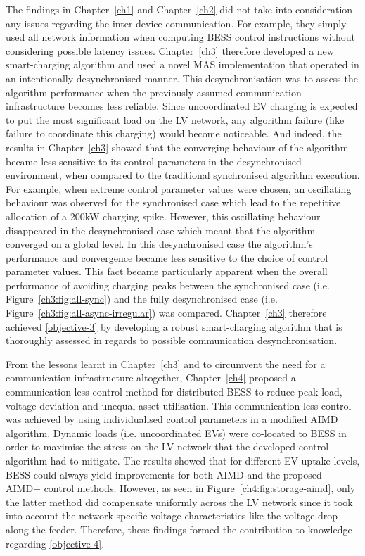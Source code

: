 The findings in Chapter~\ref{ch1} and Chapter~\ref{ch2} did not take into consideration any issues regarding the inter-device communication.
For example, they simply used all network information when computing BESS control instructions without considering possible latency issues.
Chapter~\ref{ch3} therefore developed a new smart-charging algorithm and used a novel MAS implementation that operated in an intentionally desynchronised manner.
This desynchronisation was to assess the algorithm performance when the previously assumed communication infrastructure becomes less reliable.
Since uncoordinated EV charging is expected to put the most significant load on the LV network, any algorithm failure (like failure to coordinate this charging) would become noticeable.
And indeed, the results in Chapter~\ref{ch3} showed that the converging behaviour of the algorithm became less sensitive to its control parameters in the desynchronised environment, when compared to the traditional synchronised algorithm execution.
For example, when extreme control parameter values were chosen, an oscillating behaviour was observed for the synchronised case which lead to the repetitive allocation of a 200kW charging spike.
However, this oscillating behaviour disappeared in the desynchronised case which meant that the algorithm converged on a global level.
In this desynchronised case the algorithm's performance and convergence became less sensitive to the choice of control parameter values.
This fact became particularly apparent when the overall performance of avoiding charging peaks between the synchronised case (i.e. Figure~\ref{ch3:fig:all-sync}) and the fully desynchronised case (i.e. Figure~\ref{ch3:fig:all-async-irregular}) was compared.
Chapter~\ref{ch3} therefore achieved \ref{objective-3} by developing a robust smart-charging algorithm that is thoroughly assessed in regards to possible communication desynchronisation.

From the lessons learnt in Chapter~\ref{ch3} and to circumvent the need for a communication infrastructure altogether, Chapter~\ref{ch4} proposed a communication-less control method for distributed BESS to reduce peak load, voltage deviation and unequal asset utilisation.
This communication-less control was achieved by using individualised control parameters in a modified AIMD algorithm.
Dynamic loads (i.e. uncoordinated EVs) were co-located to BESS in order to maximise the stress on the LV network that the developed control algorithm had to mitigate.
The results showed that for different EV uptake levels, BESS could always yield improvements for both AIMD and the proposed AIMD+ control methods.
However, as seen in Figure~\ref{ch4:fig:storage-aimd}, only the latter method did compensate uniformly across the LV network since it took into account the network specific voltage characteristics like the voltage drop along the feeder.
Therefore, these findings formed the contribution to knowledge regarding \ref{objective-4}.

